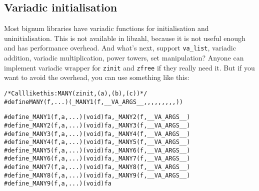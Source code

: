\subsection{Variadic initialisation}
\label{sec:Variadic initialisation}

Most bignum libraries have variadic functions
for initialisation and uninitialisation. This
is not available in libzahl, because it is
not useful enough and has performance overhead.
And what's next, support {\tt va\_list},
variadic addition, variadic multiplication,
power towers, set manipulation? Anyone can
implement variadic wrapper for {\tt zinit} and
{\tt zfree} if they really need it. But if
you want to avoid the overhead, you can use
something like this:

\begin{alltt}
   /* \textrm{Call like this:} MANY(zinit, (a), (b), (c)) */
   #define MANY(f, ...)  (_MANY1(f, __VA_ARGS__,,,,,,,,,))
   
   #define _MANY1(f, a, ...)  (void)f a, _MANY2(f, __VA_ARGS__)
   #define _MANY2(f, a, ...)  (void)f a, _MANY3(f, __VA_ARGS__)
   #define _MANY3(f, a, ...)  (void)f a, _MANY4(f, __VA_ARGS__)
   #define _MANY4(f, a, ...)  (void)f a, _MANY5(f, __VA_ARGS__)
   #define _MANY5(f, a, ...)  (void)f a, _MANY6(f, __VA_ARGS__)
   #define _MANY6(f, a, ...)  (void)f a, _MANY7(f, __VA_ARGS__)
   #define _MANY7(f, a, ...)  (void)f a, _MANY8(f, __VA_ARGS__)
   #define _MANY8(f, a, ...)  (void)f a, _MANY9(f, __VA_ARGS__)
   #define _MANY9(f, a, ...)  (void)f a
\end{alltt}
